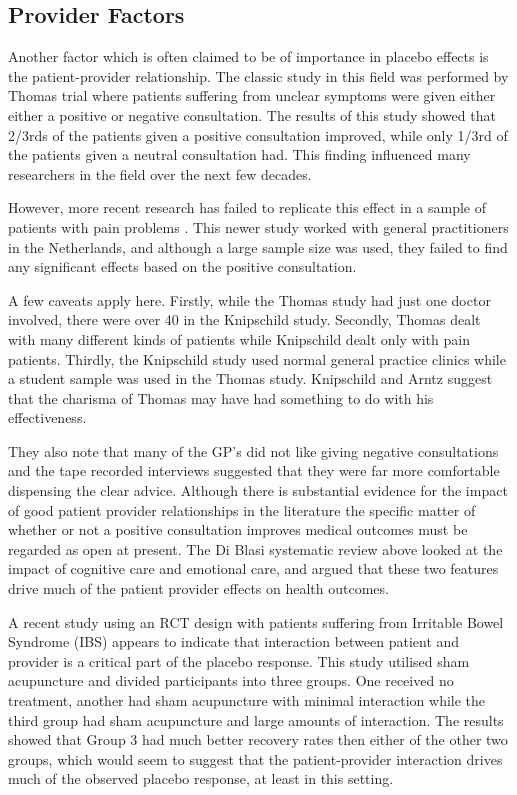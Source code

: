 \subsection{Provider Factors}

Another factor which is often claimed to be of importance in placebo effects is the patient-provider relationship. The classic study in this field was performed by Thomas \cite{thomas1987general} trial where  patients suffering from unclear symptoms were given either either a positive or negative consultation.  The results of this study showed that 2/3rds of the patients given a positive consultation improved, while only 1/3rd of the patients given a neutral consultation had. This finding influenced many researchers in the field over the next few decades. 

However, more recent research has failed to replicate this effect in a sample of patients with pain problems \cite{Knipschild2005}. This newer study worked with general practitioners in the Netherlands, and although a large sample size was used, they failed to find any significant effects based on the positive consultation. 

A few caveats apply here. Firstly, while the Thomas study had just one doctor involved, there were over 40 in the Knipschild study. Secondly, Thomas dealt with many different kinds of patients while Knipschild dealt only with pain patients. Thirdly, the Knipschild study used normal general practice clinics while a student sample was used in the Thomas study. Knipschild and Arntz suggest that the charisma of Thomas may have had something to do with his effectiveness. 

They also note that many of the GP's did not like giving negative consultations and the tape recorded interviews suggested that they were far more comfortable dispensing the clear advice.  Although there is substantial evidence for the impact of good patient provider relationships in the literature \cite{DiBlasi2001} the specific matter of whether or not a positive consultation improves medical outcomes must be regarded as open at present. The Di Blasi systematic review above looked at the impact of cognitive care and emotional care, and argued that these two features drive much of the patient provider effects on health outcomes. 

A recent study \cite{Kaptchuk2008}  using an RCT design with patients suffering from Irritable Bowel Syndrome (IBS) appears to indicate that interaction between patient and provider is a critical part of the placebo response. This study utilised sham acupuncture and divided participants into three groups. One received no treatment, another had sham acupuncture with minimal interaction while the third group had sham acupuncture and large amounts of interaction. The results showed that Group 3 had much better recovery rates then either of the other two groups, which would seem to suggest that the patient-provider interaction drives much of the observed placebo response, at least in this setting.  


